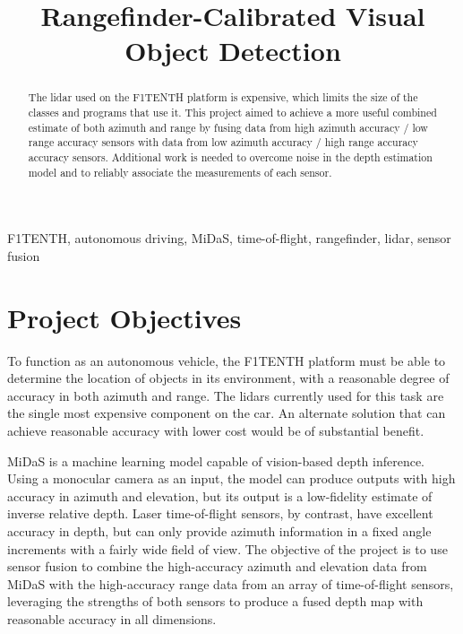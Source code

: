 \documentclass[conference]{IEEEtran}
\begin{document}
\title{Rangefinder-Calibrated Visual Object Detection}

\author{
\and
\and
\and
}

\maketitle

\begin{abstract}
The lidar used on the F1TENTH platform is expensive, which limits the size of
the classes and programs that use it. This project aimed to achieve a more
useful combined estimate of both azimuth and range by fusing data from high
azimuth accuracy / low range accuracy sensors with data from low azimuth
accuracy / high range accuracy accuracy sensors. Additional work is needed to
overcome noise in the depth estimation model and to reliably associate the
measurements of each sensor.
\end{abstract}

\begin{IEEEkeywords}
F1TENTH, autonomous driving, MiDaS, time-of-flight, rangefinder, lidar, sensor
fusion
\end{IEEEkeywords}

\section{Project Objectives}
To function as an autonomous vehicle, the F1TENTH platform must be able to
determine the location of objects in its environment, with a reasonable degree
of accuracy in both azimuth and range. The lidars currently used for this task
are the single most expensive component on the car. An alternate solution that
can achieve reasonable accuracy with lower cost would be of substantial
benefit.

MiDaS is a machine learning model capable of vision-based depth inference.
Using a monocular camera as an input, the model can produce outputs with high
accuracy in azimuth and elevation, but its output is a low-fidelity estimate of
inverse relative depth. Laser time-of-flight sensors, by contrast, have
excellent accuracy in depth, but can only provide azimuth information in a
fixed angle increments with a fairly wide field of view. The objective of the
project is to use sensor fusion to combine the high-accuracy azimuth and
elevation data from MiDaS with the high-accuracy range data from an array of
time-of-flight sensors, leveraging the strengths of both sensors to produce a
fused depth map with reasonable accuracy in all dimensions.
\end{document}
